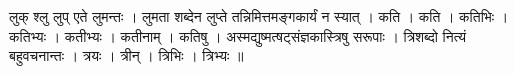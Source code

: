 लुक् श्लु लुप् एते लुमन्तः । लुमता शब्देन लुप्ते तन्निमित्तमङ्गकार्यं न
स्यात् । कति । कति । कतिभिः । कतिभ्यः । कतीभ्यः । कतीनाम् । कतिषु ।
अस्मद्युष्मत्षट्संज्ञकास्त्रिषु सरूपाः । त्रिशब्दो नित्यं बहुवचनान्तः ।
त्रयः । त्रीन् । त्रिभिः । त्रिभ्यः ॥
